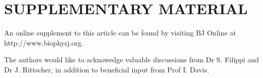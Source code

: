 \documentclass[twocolumn]{biophys}
\newcommand{\BibTeX}{\textsc{Bib}\TeX}       %
\begin{document}
\section*{SUPPLEMENTARY MATERIAL}

An online supplement to this article can be found by visiting BJ Online at http://www.biophysj.org.

\vspace{1cm}
\footnotesize The authors would like to acknowedge valuable discussions from Dr S. Filippi and Dr J. Rittscher, in addition to beneficial input from Prof I. Davis.







%






\newpage

\listoffigures

\newpage

\listoftables


\end{document}
